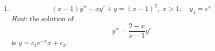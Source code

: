 \documentclass[letterpaper, fontsize=12pt]{scrartcl} %
\numberwithin{equation}{section} %
\numberwithin{figure}{section} %
\numberwithin{table}{section} %
\begin{document}
\begin{enumerate}
\begin{enumerate}[label=(\alph*)]
\item 
\[ (x-1)y'' -xy' +y=(x-1)^2, \; x> 1; \quad y_1 = e^x \]
\textit{Hint:} the solution of \[y'' = \frac{2-x}{x-1}y'\]
is $y = c_1 e^{-x} x + c_2$. 


\end{enumerate}
\end{enumerate}
\end{document}
